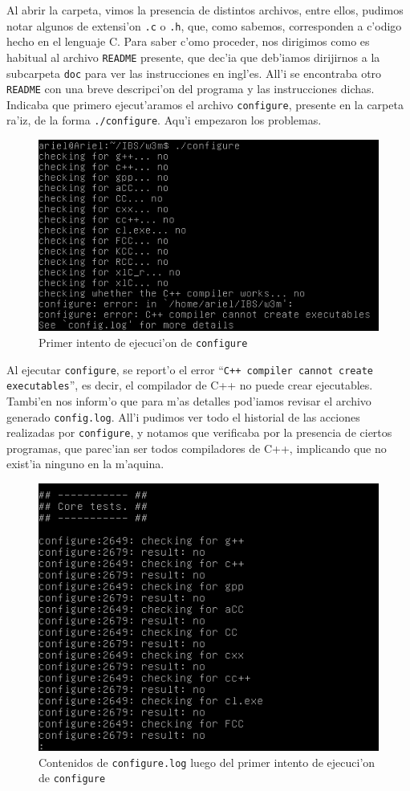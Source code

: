 \documentclass[11pt]{article}
\begin{document}
		Al abrir la carpeta, vimos la presencia de distintos archivos, entre ellos, pudimos notar algunos de extensi'on \texttt{.c} o \texttt{.h}, que, como sabemos, corresponden a c'odigo hecho en el lenguaje C. Para saber c'omo proceder, nos dirigimos como es habitual al archivo \texttt{README} presente, que dec'ia que deb'iamos dirijirnos a la subcarpeta \texttt{doc} para ver las instrucciones en ingl'es. All'i se encontraba otro \texttt{README} con una breve descripci'on del programa y las instrucciones dichas. Indicaba que primero ejecut'aramos el archivo \texttt{configure}, presente en la carpeta ra'iz, de la forma \texttt{./configure}. Aqu'i empezaron los problemas.
		
		\begin{figure}[H]
			\centering
			\includegraphics[width=.8\linewidth]{Images/Compile_w3m/g++_missing}
			\caption{Primer intento de ejecuci'on de \texttt{configure}}
			\label{fig:g++_missing}
		\end{figure}
		
		Al ejecutar \texttt{configure}, se report'o el error ``\texttt{C++ compiler cannot create executables}'', es decir, el compilador de C++ no puede crear ejecutables. Tambi'en nos inform'o que para m'as detalles pod'iamos revisar el archivo generado \texttt{config.log}. All'i pudimos ver todo el historial de las acciones realizadas por \texttt{configure}, y notamos que verificaba por la presencia de ciertos programas, que parec'ian ser todos compiladores de C++, implicando que no exist'ia ninguno en la m'aquina.
		
		\begin{figure}[H]
			\centering \captionsetup{justification=centering}
			\includegraphics[width=.7\linewidth]{Images/Compile_w3m/g++_missing_log}
			\caption{Contenidos de \texttt{configure.log} luego del primer intento de ejecuci'on de \texttt{configure}}
			\label{fig:g++_missing_log}
		\end{figure}
		
\end{document}
